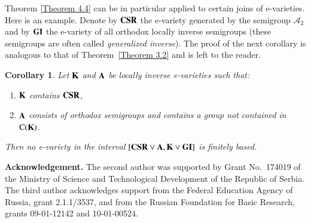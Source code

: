 \documentclass[preprint,1p,times]{elsarticle}
\numberwithin{equation}{section}
\newtheorem{Cor}[Thm]{Corollary}
\theoremstyle{remark}
\def\pv#1{{\bf #1}}
\def\Co{{\mathrm C}}
\begin{document}
Theorem \ref{Theorem 4.4} can be in particular applied to certain joins of e-varieties. Here is an example. Denote by
$\pv{CSR}$ the e-variety generated by the semigroup $\mathcal{A}_2$  and by $\pv {GI}$ the e-variety of all orthodox
locally inverse semigroups (these semigroups are often called \emph{generalized inverse}). The proof of the next
corollary is analogous to that of Theorem~\ref{Theorem 3.2} and is left to the reader.

\begin{Cor} \label{Corollary 4.6} Let $\pv K$ and $\pv A$ be locally inverse
e-varieties such that:
\renewcommand{\labelenumi}{(\theenumi)}
\begin{enumerate}
\item $\pv K$ contains $\pv{CSR}$,
\item $\pv A$ consists of orthodox semigroups and contains a group
not contained in $\Co(\pv K)$.
\end{enumerate}
Then no e-variety in the interval $[\pv{CSR}\vee \pv A, \pv K\vee\pv {GI}]$ is finitely based.
\end{Cor}

\noindent\textbf{Acknowledgement.} The second author was supported by Grant No.\ 174019 of the Ministry of Science and
Technological Development of the Republic of Serbia. The third author acknowledges support from the Federal Education
Agency of Russia, grant 2.1.1/3537, and from the Russian Foundation for Basic Research, grants 09-01-12142 and
10-01-00524.
\end{document}
